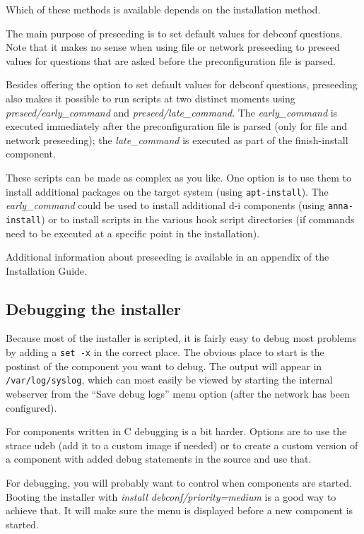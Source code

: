 \documentclass[a4paper,10pt]{article}
\begin{document}
Which of these methods is available depends on the installation method. 

The main purpose of preseeding is to set default values for debconf questions. Note that it makes no sense when using file or network preseeding to preseed values for questions that are asked before the preconfiguration file is parsed. 

Besides offering the option to set default values for debconf questions, preseeding also makes it possible to run scripts at two distinct moments using \textit{preseed/early\_command} and \textit{preseed/late\_command}. The \textit{early\_command} is executed immediately after the preconfiguration file is parsed (only for file and network preseeding); the \textit{late\_command} is executed as part of the finish-install component. 

These scripts can be made as complex as you like. One option is to use them to install additional packages on the target system (using \texttt{apt-install}). The \textit{early\_command} could be used to install additional d-i components (using \texttt{anna-install}) or to install scripts in the various hook script directories (if commands need to be executed at a specific point in the installation). 

Additional information about preseeding is available in an appendix of the Installation Guide. 


\subsection{Debugging the installer}
Because most of the installer is scripted, it is fairly easy to debug most problems by adding a \texttt{set -x} in the correct place. The obvious place to start is the postinst of the component you want to debug. The output will appear in \texttt{/var/log/syslog}, which can most easily be viewed by starting the internal webserver from the “Save debug logs” menu option (after the network has been configured). 

For components written in C debugging is a bit harder. Options are to use the strace udeb (add it to a custom image if needed) or to create a custom version of a component with added debug statements in the source and use that. 

For debugging, you will probably want to control when components are started. Booting the installer with \textit{install debconf/priority=medium} is a good way to achieve that. It will make sure the menu is displayed before a new component is started. 
\end{document}
